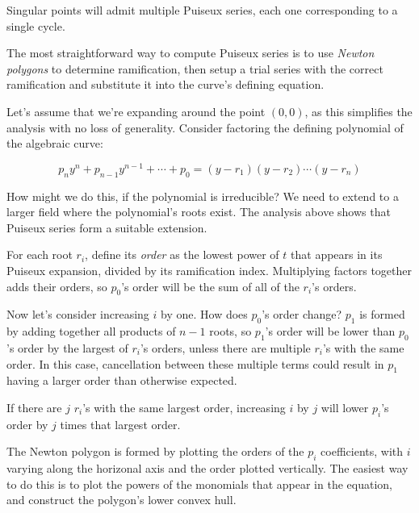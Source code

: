 Singular points will admit multiple Puiseux series, each one
corresponding to a single cycle.


The most straightforward way to compute Puiseux series is to use {\it Newton
polygons} to determine ramification, then setup a trial series with
the correct ramification and substitute it into the curve's defining
equation.

Let's assume that we're expanding around the point $(0,0)$, as this
simplifies the analysis with no loss of generality.  Consider
factoring the defining polynomial of the algebraic curve:

$$p_n y^n + p_{n-1}y^{n-1} + \cdots + p_0 = (y-r_1)(y-r_2)\cdots(y-r_n)$$

How might we do this, if the polynomial is irreducible?  We need to
extend to a larger field where the polynomial's roots exist.  The
analysis above shows that Puiseux series form a suitable extension.

For each root $r_i$, define its {\it order} as the lowest power of $t$
that appears in its Puiseux expansion, divided by its ramification
index.  Multiplying factors together adds their orders, so
$p_0$'s order will be the sum of all of the $r_i$'s orders.



Now let's consider increasing $i$ by one.  How does $p_0$'s order
change?  $p_1$ is formed by adding together all products of $n-1$
roots, so $p_1$'s order will be lower than $p_0$'s order by the
largest of $r_i$'s orders, unless there are multiple $r_i$'s with the
same order.  In this case, cancellation between these multiple terms
could result in $p_1$ having a larger order than otherwise expected.

If there are $j$ $r_i$'s with the same largest order, increasing $i$
by $j$ will lower $p_i$'s order by $j$ times that largest order.

The Newton polygon is formed by plotting the orders of the $p_i$
coefficients, with $i$ varying along the horizonal axis and the order
plotted vertically.  The easiest way to do this is to plot the powers
of the monomials that appear in the equation, and construct the
polygon's lower convex hull.

